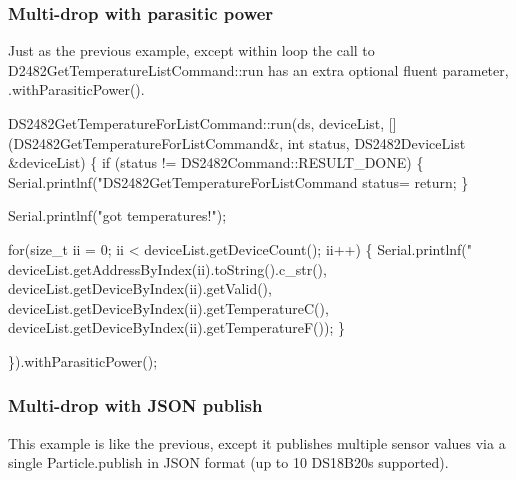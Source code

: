 \subsubsection*{Multi-\/drop with parasitic power}

Just as the previous example, except within loop the call to D2482\+Get\+Temperature\+List\+Command\+::run has an extra optional fluent parameter, {\ttfamily .with\+Parasitic\+Power()}.


\begin{DoxyCode}
DS2482GetTemperatureForListCommand::run(ds, deviceList, [](DS2482GetTemperatureForListCommand&, int status,
       DS2482DeviceList &deviceList) \{
    if (status != DS2482Command::RESULT\_DONE) \{
        Serial.printlnf("DS2482GetTemperatureForListCommand status=%
        return;
    \}

    Serial.printlnf("got temperatures!");

    for(size\_t ii = 0; ii < deviceList.getDeviceCount(); ii++) \{
        Serial.printlnf("%
                deviceList.getAddressByIndex(ii).toString().c\_str(),
                deviceList.getDeviceByIndex(ii).getValid(),
                deviceList.getDeviceByIndex(ii).getTemperatureC(),
                deviceList.getDeviceByIndex(ii).getTemperatureF());
    \}

\}).withParasiticPower();
\end{DoxyCode}


\subsubsection*{Multi-\/drop with J\+S\+ON publish}

This example is like the previous, except it publishes multiple sensor values via a single Particle.\+publish in J\+S\+ON format (up to 10 D\+S18\+B20s supported).


